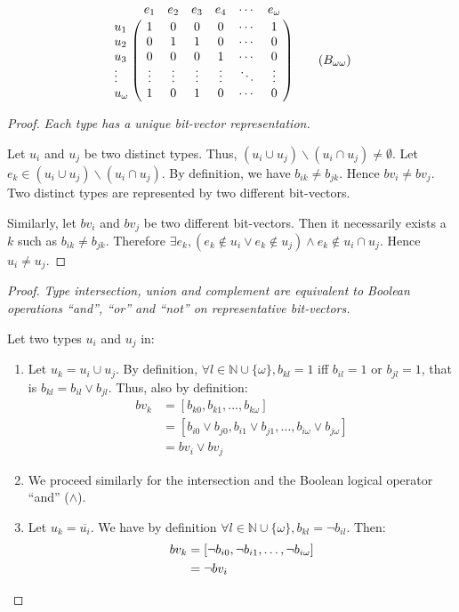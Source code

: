 \documentclass[format=sigconf]{acmart}
\theoremstyle{definition}
\begin{document}
\[
  \bordermatrix{
            &e_1   &e_2   &e_3   &e_4   &\cdots&e_\omega \cr
    u_1     &1     &0     &0     &0     &\cdots&1       \cr
    u_2     &0     &1     &1     &0     &\cdots&0       \cr
    u_3     &0     &0     &0     &1     &\cdots&0       \cr
    \vdots  &\vdots&\vdots&\vdots&\vdots&\ddots&\vdots  \cr
    u_\omega&1     &0     &1     &0     &\cdots&0
  } \label{eq:matrix} \tag{$B_{\omega\omega}$}
\]

\begin{proof}
  \emph{\small Each type has a unique bit-vector representation.}
  \newcommand{\reldiff}[2]{(#1 \cup #2) \backslash (#1 \cap #2)}

  Let $u_i$ and $u_j$ be two distinct types. Thus, $\reldiff{u_i}{u_j} \neq \emptyset$.
  Let $e_k \in \reldiff{u_i}{u_j}$. By definition, we have $b_{ik} \neq b_{jk}$.
  Hence $bv_i \neq bv_j$. Two distinct types are represented by two different
  bit-vectors.

  Similarly, let $bv_i$ and $bv_j$ be two different bit-vectors. Then it
  necessarily exists a $k$ such as $b_{ik} \neq b_{jk}$. Therefore
  $\exists e_k, \left(e_k \notin u_i \vee e_k \notin u_j\right) \wedge e_k
  \notin u_i \cap u_j$. Hence $u_i \neq u_j$. \qedhere
\end{proof}

\begin{proof}
  \emph{\small Type intersection, union and complement are equivalent to Boolean
    operations ``and'', ``or'' and ``not'' on representative bit-vectors.}

  Let two types $u_i$ and $u_j$ in:
  \begin{enumerate}
  \item Let $u_k = u_i \cup u_j$. By definition, $\forall l \in \mathbb{N} \cup
    \{\omega\}, b_{kl} = 1$ iff $b_{il} = 1$ or $b_{jl} = 1$, that is $b_{kl} =
    b_{il} \vee b_{jl}$. Thus, also by definition:
    \begin{align*}
      bv_k &= \left[b_{k0}, b_{k1}, \dots, b_{k\omega}\right]  \\
           &= \left[b_{i0} \vee b_{j0}, b_{i1} \vee b_{j1}, \dots, b_{i\omega} \vee b_{j\omega}\right]  \\
           &= bv_i \vee bv_j
    \end{align*}
  \item We proceed similarly for the intersection and the Boolean logical operator
    ``and'' ($\wedge$).
  \item Let $u_k = \overline{u_i}$. We have by definition $\forall l \in
    \mathbb{N} \cup \{\omega\}, b_{kl} = \neg b_{il}$. Then:
    \begin{align*}
      bv_k &= \left[\neg b_{i0}, \neg b_{i1}, \dots, \neg b_{i\omega}\right]  \\
           &= \neg bv_i \qedhere
    \end{align*}
  \end{enumerate}
\end{proof}
\end{document}
